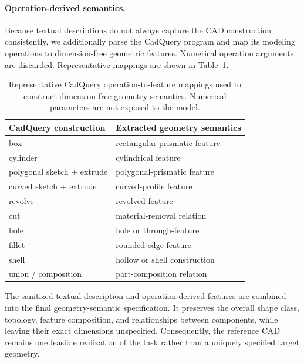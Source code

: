 \paragraph{Operation-derived semantics.}
Because textual descriptions do not always capture the CAD construction
consistently, we additionally parse the CadQuery program and map its modeling
operations to dimension-free geometric features. Numerical operation arguments
are discarded. Representative mappings are shown in
Table~\ref{tab:operation_semantics}.

\begin{table}[t]
    \centering
    \caption{
    Representative CadQuery operation-to-feature mappings used to construct
    dimension-free geometry semantics. Numerical parameters are not exposed
    to the model.
    }
    \label{tab:operation_semantics}
    \small
    \begin{tabular}{ll}
        \toprule
        \textbf{CadQuery construction} & \textbf{Extracted geometry semantics} \\
        \midrule
        box                         & rectangular-prismatic feature \\
        cylinder                    & cylindrical feature \\
        polygonal sketch + extrude  & polygonal-prismatic feature \\
        curved sketch + extrude     & curved-profile feature \\
        revolve                     & revolved feature \\
        cut                         & material-removal relation \\
        hole                        & hole or through-feature \\
        fillet                      & rounded-edge feature \\
        shell                       & hollow or shell construction \\
        union / composition         & part-composition relation \\
        \bottomrule
    \end{tabular}
\end{table}

The sanitized textual description and operation-derived features are combined
into the final geometry-semantic specification. It preserves the overall shape
class, topology, feature composition, and relationships between components,
while leaving their exact dimensions unspecified. Consequently, the reference
CAD remains one feasible realization of the task rather than a uniquely
specified target geometry.


